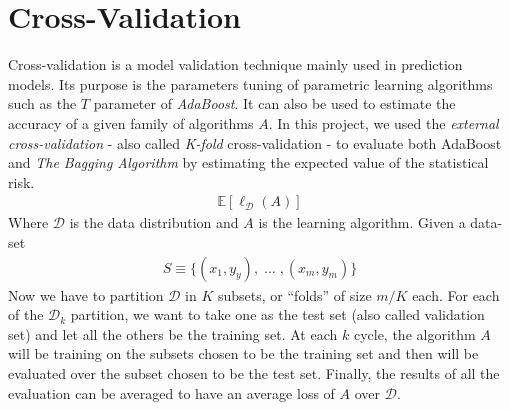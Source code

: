 \chapter{Cross-Validation}
Cross-validation is a model validation technique mainly used in prediction models. Its purpose is the parameters tuning of parametric learning algorithms such as the $T$ parameter of \textit{AdaBoost}. It can also be used to estimate the accuracy of a given family of algorithms $A$. In this project, we used the \textit{external cross-validation} - also called \textit{K-fold} cross-validation - to evaluate both AdaBoost and \textit{The Bagging Algorithm} by estimating the expected value of the statistical risk.
\begin{align*}
	\mathbb{E}[\ell_{\mathcal{D}}(A)]
\end{align*}
Where $\mathcal{D}$ is the data distribution and $A$ is the learning algorithm. Given a data-set
\begin{align*}
	S \equiv \lbrace (x_{1},y_{y}),\;\dots\;,(x_{m},y_{m}) \rbrace
\end{align*}
Now we have to partition $\mathcal{D}$ in $K$ subsets, or ``folds'' of size $m/K$ each. For each of the $\mathcal{D}_{k}$ partition, we want to take one as the test set (also called validation set) and let all the others be the training set. At each $k$ cycle, the algorithm $A$ will be training on the subsets chosen to be the training set and then will be evaluated over the subset chosen to be the test set. Finally, the results of all the evaluation can be averaged to have an average loss of $A$ over $\mathcal{D}$.
